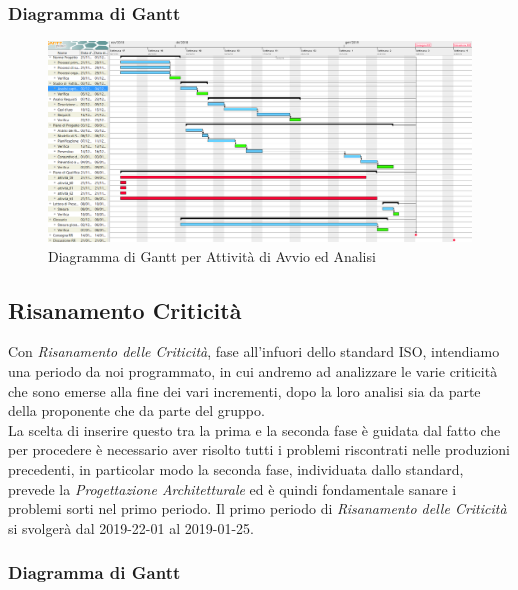 \begin{landscape}
\subsubsection{Diagramma di Gantt}
\begin{figure}[H]
	\centering
  		\includegraphics[width=1.0\linewidth]{./images/AvvioAnalisi.png}
  		\caption{Diagramma di Gantt per Attività di Avvio ed Analisi}
  		\label{fig:Gantt Avvio ed Analisi}
\end{figure}
\end{landscape}

\subsection{Risanamento Criticità}

Con \textit{Risanamento delle Criticità}, fase all'infuori dello standard ISO, intendiamo una periodo da noi programmato, in cui andremo ad analizzare le varie criticità che sono emerse alla fine dei vari incrementi, dopo la loro analisi sia da parte della proponente che da parte del gruppo. \\
La scelta di inserire questo tra la prima e la seconda fase è guidata dal fatto che per procedere è necessario aver risolto tutti i problemi riscontrati nelle produzioni precedenti, in particolar modo la seconda fase, individuata dallo standard, prevede la \textit{Progettazione Architetturale} ed è quindi fondamentale sanare i problemi sorti nel primo periodo. 
Il primo periodo di \textit{Risanamento delle Criticità} si svolgerà dal 2019-22-01 al 2019-01-25.

\subsubsection{Diagramma di Gantt}

